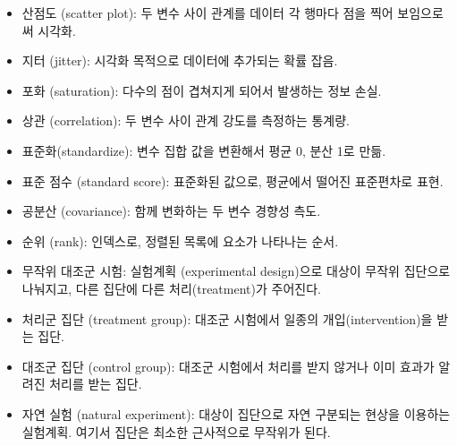 \begin{itemize}

\item 산점도 (scatter plot): 두 변수 사이 관계를 데이터 각 행마다 점을 찍어 보임으로써 시각화.

\item 지터 (jitter): 시각화 목적으로 데이터에 추가되는 확률 잡음.

\item 포화 (saturation): 다수의 점이 겹쳐지게 되어서 발생하는 정보 손실.

\item 상관 (correlation): 두 변수 사이 관계 강도를 측정하는 통계량.

\item 표준화(standardize): 변수 집합 값을 변환해서 평균 0, 분산 1로 만듦.

\item 표준 점수 (standard score): 표준화된 값으로, 평균에서 떨어진 표준편차로 표현.

\item 공분산 (covariance): 함께 변화하는 두 변수 경향성 측도.

\item 순위 (rank): 인덱스로, 정렬된 목록에 요소가 나타나는 순서.

\item 무작위 대조군 시험: 실험계획 (experimental design)으로 대상이 무작위 집단으로 나눠지고, 다른 집단에 다른 처리(treatment)가 주어진다.

\item 처리군 집단 (treatment group): 대조군 시험에서 일종의 개입(intervention)을 받는 집단.

\item 대조군 집단 (control group): 대조군 시험에서 처리를 받지 않거나 이미 효과가 알려진 처리를 받는 집단.

\item 자연 실험 (natural experiment): 대상이 집단으로 자연 구분되는 현상을 이용하는 실험계획. 여기서 집단은 최소한 근사적으로 무작위가 된다.

\end{itemize}

